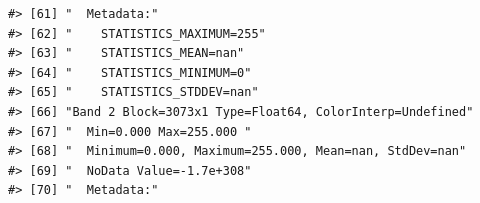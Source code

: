 \documentclass[
]{book}
\begin{document}
\begin{verbatim}
#> [61] "  Metadata:"                                                                                                                                                                                                                                                                    
#> [62] "    STATISTICS_MAXIMUM=255"                                                                                                                                                                                                                                                     
#> [63] "    STATISTICS_MEAN=nan"                                                                                                                                                                                                                                                        
#> [64] "    STATISTICS_MINIMUM=0"                                                                                                                                                                                                                                                       
#> [65] "    STATISTICS_STDDEV=nan"                                                                                                                                                                                                                                                      
#> [66] "Band 2 Block=3073x1 Type=Float64, ColorInterp=Undefined"                                                                                                                                                                                                                        
#> [67] "  Min=0.000 Max=255.000 "                                                                                                                                                                                                                                                       
#> [68] "  Minimum=0.000, Maximum=255.000, Mean=nan, StdDev=nan"                                                                                                                                                                                                                         
#> [69] "  NoData Value=-1.7e+308"                                                                                                                                                                                                                                                       
#> [70] "  Metadata:"                                                                                                                                                                                                                                                                    

\end{verbatim}
\end{document}
